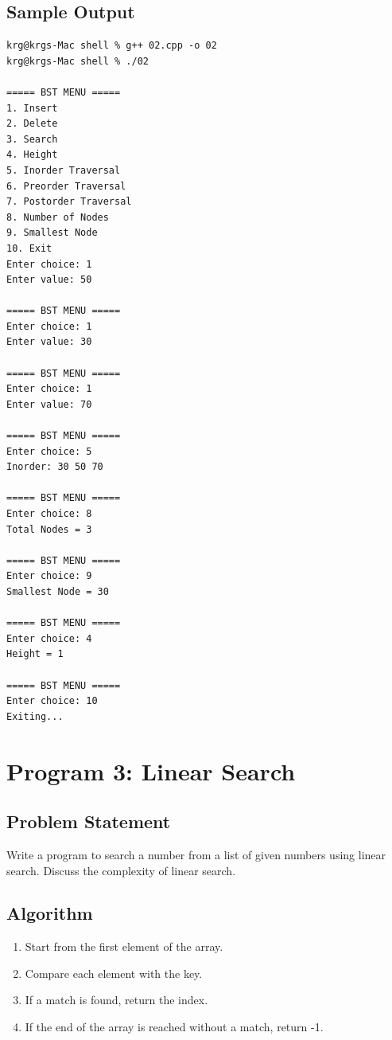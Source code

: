 \documentclass[a4paper,12pt]{article}
\begin{document}
\subsection*{Sample Output}
\begin{lstlisting}[style=outputstyle]
krg@krgs-Mac shell % g++ 02.cpp -o 02
krg@krgs-Mac shell % ./02

===== BST MENU =====
1. Insert
2. Delete
3. Search
4. Height
5. Inorder Traversal
6. Preorder Traversal
7. Postorder Traversal
8. Number of Nodes
9. Smallest Node
10. Exit
Enter choice: 1
Enter value: 50

===== BST MENU =====
Enter choice: 1
Enter value: 30

===== BST MENU =====
Enter choice: 1
Enter value: 70

===== BST MENU =====
Enter choice: 5
Inorder: 30 50 70 

===== BST MENU =====
Enter choice: 8
Total Nodes = 3

===== BST MENU =====
Enter choice: 9
Smallest Node = 30

===== BST MENU =====
Enter choice: 4
Height = 1

===== BST MENU =====
Enter choice: 10
Exiting...
\end{lstlisting}

\newpage

\section*{Program 3: Linear Search}

\subsection*{Problem Statement}
Write a program to search a number from a list of given numbers using linear search. Discuss the complexity of linear search.

\subsection*{Algorithm}
\begin{enumerate}
    \item Start from the first element of the array.
    \item Compare each element with the key.
    \item If a match is found, return the index.
    \item If the end of the array is reached without a match, return -1.
\end{enumerate}
\end{document}
